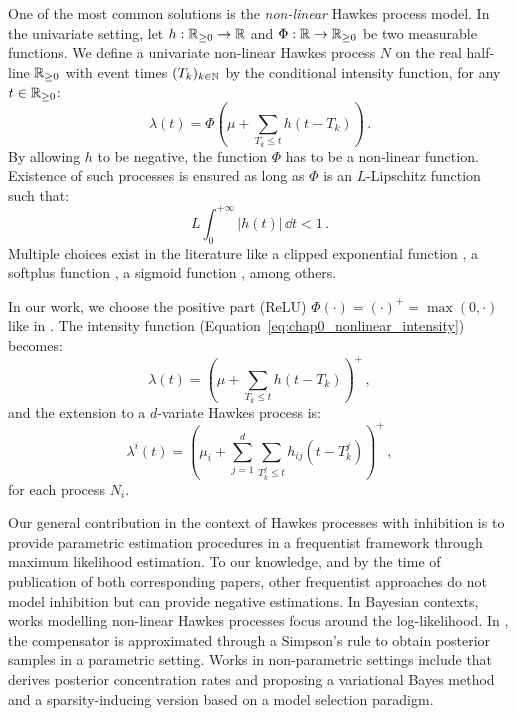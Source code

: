     One of the most common solutions is the \emph{non-linear} Hawkes process model. In the univariate setting, let $h:{\mathbb R}_{\geq 0} \to {\mathbb R}$ and $\Phi:{\mathbb R}\to{\mathbb R}_{\geq 0}$ be two measurable functions. We define a univariate non-linear Hawkes process $N$ on the real half-line ${\mathbb R}_{\geq 0}$ with event times $(T_k)_{k\in{\mathbb N}}$ by the conditional intensity function, for any $t\in{\mathbb R}_{\geq 0}$:
    \begin{equation}\label{eq:chap0_nonlinear_intensity}
      \lambda(t) = \Phi\left(\mu + \sum_{T_k \leq t}{h(t-T_k)}\right)\,.
    \end{equation}
    By allowing $h$ to be negative, the function $\Phi$ has to be a non-linear function. Existence of such processes is ensured as long as $\Phi$ is an $L$-Lipschitz function \parencite[Theorem 1]{Bremaud1996} such that:
    \[L\int_{0}^{+\infty}{\lvert h(t)\rvert\,\dd t} <1\,.\]
    Multiple choices exist in the literature like a clipped exponential function \parencite{Chornoboy1988,Carstensen2010,Gerhard2017}, a softplus function \parencite{Mei2017}, a sigmoid function \parencite{Menon2018}, among others.
    
    In our work, we choose the positive part (ReLU) $\Phi(\cdot) = (\cdot)^+ = \max(0, \cdot)$ like in \textcite{Lemonnier2014, Hansen2015, Lu2018, Costa2020}.
    The intensity function (Equation~\eqref{eq:chap0_nonlinear_intensity}) becomes:
    \begin{equation}\label{eq:chap0_nonlinear_univariate_intensity}
      \lambda(t) = \left(\mu + \sum_{T_k \leq t}{h(t-T_k)}\right)^+\,,
    \end{equation}
    and the extension to a $d$-variate Hawkes process is:
    \begin{equation}\label{eq:chap0_nonlinear_multivariate_intensity}
      \lambda^i(t) = \left(\mu_i + \sum_{j=1}^{d}\sum_{T_k^j \leq t}{h_{ij}(t-T_k^j)}\right)^+\,,
    \end{equation}
    for each process $N_i$.

    Our general contribution in the context of Hawkes processes with inhibition is to provide parametric estimation procedures in a frequentist framework through maximum likelihood estimation.
    To our knowledge, and by the time of publication of both corresponding papers, other frequentist approaches \parencite{Reynaud2014,Bacry2016} do not model inhibition but can provide negative estimations.
    In Bayesian contexts, works modelling non-linear Hawkes processes focus around the log-likelihood. In \textcite{Deutsch2022}, the compensator is approximated through a Simpson's rule to obtain posterior samples in a parametric setting. 
    Works in non-parametric settings include \textcite{Sulem2024} that derives posterior concentration rates and \textcite{Sulem2023} proposing a variational Bayes method and a sparsity-inducing version based on a model selection paradigm.

